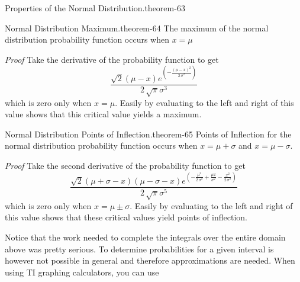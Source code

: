 \documentclass[10pt,]{book}
\makeatletter
\renewcommand*{\proofname}{Proof}
\renewenvironment{proof}[1][\proofname]{\par
  \pushQED{\qed}%
  \normalfont \topsep6\p@\@plus6\p@\relax
  \trivlist
  \item\relax
    {\itshape
    #1\@addpunct{.}}\hspace\labelsep\ignorespaces
}{%
  \popQED\endtrivlist\@endpefalse
}
\numberwithin{equation}{section}
\makeatother
\begin{document}
%
\par
\hypertarget{p-1191}{}%
\begin{theorem}{Properties of the Normal Distribution.}{}{theorem-63}%
\end{theorem}
%
\par
\hypertarget{p-1192}{}%
\begin{theorem}{Normal Distribution Maximum.}{}{theorem-64}%
\hypertarget{p-1193}{}%
The maximum of the normal distribution probability function occurs when \(x = \mu\)%
\end{theorem}
\begin{proof}\hypertarget{proof-65}{}
\hypertarget{p-1194}{}%
Take the derivative of the probability function to get%
\begin{equation*}
\frac{\sqrt{2} {\left(\mu - x\right)} e^{\left(-\frac{{\left(\mu - x\right)}^{2}}{2 \, \sigma^{2}}\right)}}{2 \, \sqrt{\pi} \sigma^{3}}
\end{equation*}
which is zero only when \(x = \mu\).  Easily by evaluating to the left and right of this value shows that this critical value yields a maximum.%
\end{proof}
%
\par
\hypertarget{p-1195}{}%
\begin{theorem}{Normal Distribution Points of Inflection.}{}{theorem-65}%
\hypertarget{p-1196}{}%
Points of Inflection for the normal distribution probability function occurs when \(x = \mu + \sigma\) and \(x = \mu - \sigma\).%
\end{theorem}
\begin{proof}\hypertarget{proof-66}{}
\hypertarget{p-1197}{}%
Take the second derivative of the probability function to get%
\begin{equation*}
\frac{\sqrt{2} {\left(\mu + \sigma - x\right)} {\left(\mu - \sigma - x\right)} e^{\left(-\frac{\mu^{2}}{2 \, \sigma^{2}} + \frac{\mu x}{\sigma^{2}} - \frac{x^{2}}{2 \, \sigma^{2}}\right)}}{2 \, \sqrt{\pi} \sigma^{5}}
\end{equation*}
which is zero only when \(x = \mu \pm \sigma\).  Easily by evaluating to the left and right of this value shows that these critical values yield points of inflection.%
\end{proof}
%
\par
\hypertarget{p-1198}{}%
Notice that the work needed to complete the integrals over the entire domain above was pretty serious. To determine probabilities for a given interval is however not possible in general and therefore approximations are needed. When using TI graphing calculators, you can use%
\end{document}
